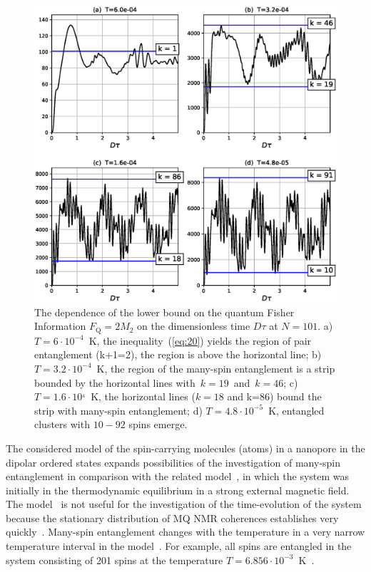 \documentclass[review]{elsarticle}
\begin{document}
\begin{figure}
  	\includegraphics[width=0.95\linewidth]{fisher_low_bound_n101.eps}
	\caption{
	    The dependence of the lower bound on the quantum Fisher Information $F_\mathrm{Q} = 2 M_{2}$ 
	    on the dimensionless time $D\tau$ at $N=101$.
	    a) $T=6\cdot10^{-4}$~K, the inequality~(\ref{eq:20}) yields the region of pair entanglement (k+1=2), the region is above the horizontal line; 
	    b) $T=3.2\cdot10^{-4}$~K, the region of the many-spin entanglement is a strip bounded by the horizontal lines with~$k=19$~and~$k=46$; 
	    c) $T = 1.6\cdot10^{_4}$~K, the horizontal lines ($k=18$ and k=$86$) bound the strip with many-spin entanglement;
	    d) $T=4.8\cdot10^{-5}$~K, entangled clusters with $10-92$ spins emerge.
	}
	\label{fig:2}
\end{figure}

The considered model of the spin-carrying molecules (atoms) in a nanopore in the dipolar ordered states expands possibilities of the investigation of many-spin entanglement in comparison with the related model~\cite{Doronin_2019},
in which the system was initially in the thermodynamic equilibrium in a strong external magnetic field.
The model~\cite{Doronin_2019}  is not useful for the investigation of the time-evolution of the system
because the stationary distribution of MQ NMR coherences establishes very quickly~\cite{Doronin_2009}.
Many-spin entanglement changes with the temperature in a very narrow temperature interval in the model~\cite{Doronin_2019}.
For example, all spins are entangled in the system consisting of 201 spins at the temperature $T=6.856\cdot10^{-3}$~K~\cite{Doronin_2019}.
\end{document}
